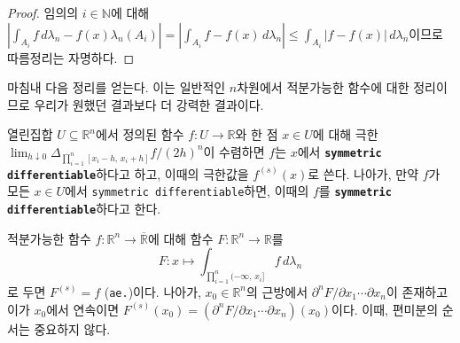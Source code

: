 \begin{proof}
    임의의 $i\in\mathbb{N}$에 대해 $|\int_{A_i}f\,d\lambda_n-f(x)\lambda_n(A_i)|=|\int_{A_i}f-f(x)\,d\lambda_n|\leq\int_{A_i}|f-f(x)|\,d\lambda_n$이므로 따름정리는 자명하다.
\end{proof}

마침내 다음 정리를 얻는다. 이는 일반적인 $n$차원에서 적분가능한 함수에 대한 정리이므로 우리가 원했던 결과보다 더 강력한 결과이다.

\begin{definition}
    열린집합 $U\subseteq\mathbb{R}^n$에서 정의된 함수 $f:U\to\mathbb{R}$와 한 점 $x\in U$에 대해 극한 $\lim_{h\downarrow0}\Delta_{\prod_{i=1}^n[x_i-h,\,x_i+h]}f/(2h)^n$이 수렴하면 $f$는 $x$에서 \textbf{\texttt{symmetric differentiable}}하다고 하고, 이때의 극한값을 $f^{(s)}(x)$로 쓴다. 나아가, 만약 $f$가 모든 $x\in U$에서 \texttt{symmetric differentiable}하면, 이때의 $f$를 \textbf{\texttt{symmetric differentiable}}하다고 한다.
\end{definition}

\begin{corollary}\label{cor:FTC1}
    적분가능한 함수 $f:\mathbb{R}^n\to\overline{\mathbb{R}}$에 대해 함수 $F:\mathbb{R}^n\to\mathbb{R}$를
    \begin{equation*}
        F:x\mapsto\int_{\prod_{i=1}^n(-\infty,\,x_i]}f\,d\lambda_n
    \end{equation*}
    로 두면 $F^{(s)}=f$ (\texttt{ae.})이다. 나아가, $x_0\in\mathbb{R}^n$의 근방에서 $\partial^nF/\partial x_1\cdots\partial x_n$이 존재하고 이가 $x_0$에서 연속이면 $F^{(s)}(x_0)=(\partial^nF/\partial x_1\cdots\partial x_n)(x_0)$이다. 이때, 편미분의 순서는 중요하지 않다.
\end{corollary}

